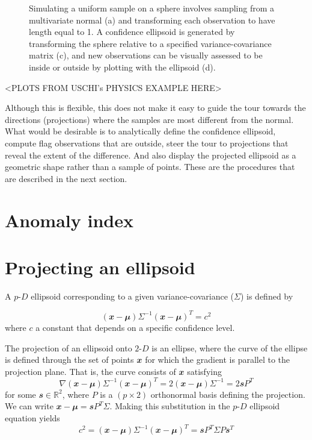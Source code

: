 \documentclass[
  12pt]{article}
\newcommand\pD{$p\text{-}D$}
\newcommand\gD{$2\text{-}D$}
\begin{document}
\begin{figure}


\caption{\label{fig-ci}Simulating a uniform sample on a sphere involves
sampling from a multivariate normal (a) and transforming each
observation to have length equal to 1. A confidence ellipsoid is
generated by transforming the sphere relative to a specified
variance-covariance matrix (c), and new observations can be visually
assessed to be inside or outside by plotting with the ellipsoid (d).}

\end{figure}%

\textless PLOTS FROM USCHI's PHYSICS EXAMPLE HERE\textgreater{}

Although this is flexible, this does not make it easy to guide the tour
towards the directions (projections) where the samples are most
different from the normal. What would be desirable is to analytically
define the confidence ellipsoid, compute flag observations that are
outside, steer the tour to projections that reveal the extent of the
difference. And also display the projected ellipsoid as a geometric
shape rather than a sample of points. These are the procedures that are
described in the next section.

\section{Anomaly index}\label{sec-anomaly-index}

\section{Projecting an ellipsoid}\label{projecting-an-ellipsoid}

A \pD{} ellipsoid corresponding to a given variance-covariance
(\(\Sigma\)) is defined by

\[
(\mathbfit{x}-\mathbfit{\mu}) \Sigma^{-1}(\mathbfit{x}-\mathbfit{\mu})^T = c^2
\] where \(c\) a constant that depends on a specific confidence level.

The projection of an ellipsoid onto \gD{} is an ellipse, where the curve
of the ellipse is defined through the set of points \(\mathbfit{x}\) for
which the gradient is parallel to the projection plane. That is, the curve 
consists of \(\mathbfit{x}\) satisfying
\[
\nabla (\mathbfit{x}-\mathbfit{\mu}) \Sigma^{-1}(\mathbfit{x}-\mathbfit{\mu})^T = 2 (\mathbfit{x}-\mathbfit{\mu}) \Sigma^{-1} = 2\mathbfit{s}P^T
\]
for some \(\mathbfit{s} \in \mathbb{R}^2\), where \(P\) is a \((p\times 2)\) orthonormal basis defining the
projection. We can write \(\mathbfit{x}-\mathbfit{\mu} = \mathbfit{s} P^T \Sigma\).
Making this substitution in the \pD{} ellipsoid equation yields
\[
c^2 = (\mathbfit{x}-\mathbfit{\mu}) \Sigma^{-1}(\mathbfit{x}-\mathbfit{\mu})^T = \mathbfit{s} P^T \Sigma P \mathbfit{s}^T
\]
\end{document}
